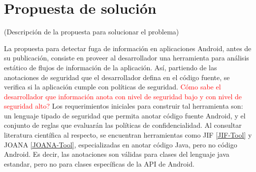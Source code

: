\section{Propuesta de solución}
\label{sec:propuesta-sol} 
(Descripción de la propuesta para solucionar el problema)

La propuesta para detectar fuga de información en aplicaciones Android, antes de
su publicación, consiste en proveer al desarrollador una herramienta para
análisis estático de flujos de información de la aplicación. Así, partiendo de
las anotaciones de seguridad que el desarrollador defina en el código fuente, se
verifica si la aplicación cumple con políticas de seguridad.\newline
\textcolor{red}{Cómo sabe el desarrollador que información anota con nivel de
seguridad bajo y con nivel de seguridad alto?}\newline
Los requerimientos iniciales para construir tal herramienta son: un lenguaje
tipado de seguridad que permita anotar código fuente Android, y el conjunto de
reglas que evaluarán las políticas de confidencialidad.\newline 
Al consultar literatura científica al respecto, se encuentran herramientas como
JIF \ref{JIF-Tool} y JOANA \ref{JOANA-Tool}, especializadas en anotar código
Java, pero no código Android. Es decir, las anotaciones son válidas para clases
del lenguaje java estandar, pero no para clases específicas de la API de Android.

